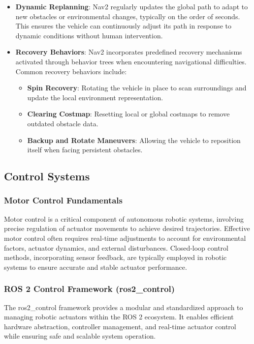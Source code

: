 \documentclass[english,project]{buwthesis}
\begin{document}
\begin{itemize}
    \item \textbf{Dynamic Replanning}:  Nav2 regularly updates the global path to adapt to new obstacles or environmental changes, typically on the order of seconds. This ensures the vehicle can continuously adjust its path in response to dynamic conditions without human intervention.
    
    \item \textbf{Recovery Behaviors}: Nav2 incorporates predefined recovery mechanisms activated through behavior trees when encountering navigational difficulties. Common recovery behaviors include:
    \begin{itemize}
        \item \textbf{Spin Recovery}: Rotating the vehicle in place to scan surroundings and update the local environment representation.
        \item \textbf{Clearing Costmap}: Resetting local or global costmaps to remove outdated obstacle data.
        \item \textbf{Backup and Rotate Maneuvers}: Allowing the vehicle to reposition itself when facing persistent obstacles.
    \end{itemize}
\end{itemize}



\subsection{Control Systems}
\subsubsection{Motor Control Fundamentals}
Motor control is a critical component of autonomous robotic systems, involving precise regulation of actuator movements to achieve desired trajectories. Effective motor control often requires real-time adjustments to account for environmental factors, actuator dynamics, and external disturbances. Closed-loop control methods, incorporating sensor feedback, are typically employed in robotic systems to ensure accurate and stable actuator performance.
\subsubsection{ROS 2 Control Framework (ros2\_control)}
The ros2\_control framework provides a modular and standardized approach to managing robotic actuators within the ROS 2 ecosystem. It enables efficient hardware abstraction, controller management, and real-time actuator control while ensuring safe and scalable system operation.
\end{document}
